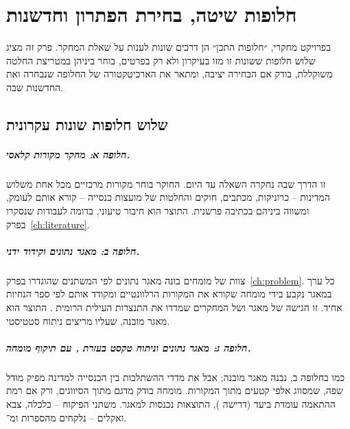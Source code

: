 
\chapter{חלופות שיטה, בחירת הפתרון וחדשנות}
\label{ch:alternatives}

בפרויקט מחקרי, ״חלופות התכן״ הן דרכים שונות לענות על שאלת המחקר. פרק זה מציג שלוש חלופות ששונות זו מזו בעיקרון ולא רק בפרטים, בוחר ביניהן במטריצת החלטה משוקללת, בודק אם הבחירה יציבה, ומתאר את הארכיטקטורה של החלופה שנבחרה ואת החדשנות שבה.

\section{שלוש חלופות שונות עקרונית}
\label{sec:alt-three}

\paragraph{חלופה א: מחקר מקורות קלאסי.} זו הדרך שבה נחקרה השאלה עד היום. החוקר בוחר מקורות מרכזיים מכל אחת משלוש המדינות – כרוניקות, מכתבים, חוקים והחלטות של מועצות כנסייה – קורא אותם לעומק, ומשווה ביניהם בכתיבה פרשנית. התוצר הוא חיבור טיעוני, בדומה לעבודות שנסקרו בפרק~\ref{ch:literature}.

\paragraph{חלופה ב: מאגר נתונים וקידוד ידני.} צוות של מומחים בונה מאגר נתונים לפי המשתנים שהוגדרו בפרק~\ref{ch:problem}. כל ערך במאגר נקבע בידי מומחה שקורא את המקורות הרלוונטיים ומקודד אותם לפי ספר הנחיות אחיד. זו הגישה של מאגר  ושל המחקרים שמדדו את התנצרות העילית הרומית \cite{salzman2002making}. התוצר הוא מאגר מובנה, שעליו מריצים ניתוח סטטיסטי.

\paragraph{חלופה ג: מאגר נתונים וניתוח טקסט בעזרת , עם תיקוף מומחה.} כמו בחלופה ב, נבנה מאגר מובנה; אבל את מדדי ההשתלבות בין הכנסייה למדינה מפיק מודל שפה, שמסווג אלפי קטעים מתוך המקורות. מומחה בודק מדגם מתוך הסיווגים, ורק אם רמת ההתאמה עומדת ביעד (דרישה ), התוצאות נכנסות למאגר. משתני הפיקוח – כלכלה, צבא ואקלים – נלקחים מהספרות ומ־.

